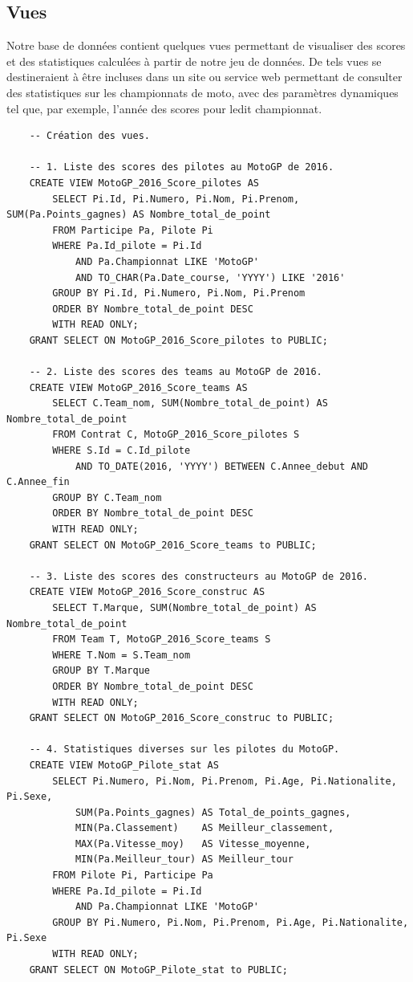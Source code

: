 \documentclass[12pt,a4paper]{article}
\newenvironment{code}{\captionsetup{type=listing}}{}
\begin{document}
\subsection{Vues}
\label{sub.views}

Notre base de données contient quelques vues permettant de visualiser des scores
et des statistiques calculées à partir de notre jeu de données. De tels vues se
destineraient à être incluses dans un site ou service web permettant de consulter
des statistiques sur les championnats de moto, avec des paramètres dynamiques
tel que, par exemple, l'année des scores pour ledit championnat.

\begin{code}
    \begin{verbatim}
    -- Création des vues.

    -- 1. Liste des scores des pilotes au MotoGP de 2016.
    CREATE VIEW MotoGP_2016_Score_pilotes AS
        SELECT Pi.Id, Pi.Numero, Pi.Nom, Pi.Prenom, SUM(Pa.Points_gagnes) AS Nombre_total_de_point
        FROM Participe Pa, Pilote Pi
        WHERE Pa.Id_pilote = Pi.Id
            AND Pa.Championnat LIKE 'MotoGP'
            AND TO_CHAR(Pa.Date_course, 'YYYY') LIKE '2016'
        GROUP BY Pi.Id, Pi.Numero, Pi.Nom, Pi.Prenom
        ORDER BY Nombre_total_de_point DESC
        WITH READ ONLY;
    GRANT SELECT ON MotoGP_2016_Score_pilotes to PUBLIC;

    -- 2. Liste des scores des teams au MotoGP de 2016.
    CREATE VIEW MotoGP_2016_Score_teams AS
        SELECT C.Team_nom, SUM(Nombre_total_de_point) AS Nombre_total_de_point
        FROM Contrat C, MotoGP_2016_Score_pilotes S
        WHERE S.Id = C.Id_pilote
            AND TO_DATE(2016, 'YYYY') BETWEEN C.Annee_debut AND C.Annee_fin
        GROUP BY C.Team_nom
        ORDER BY Nombre_total_de_point DESC
        WITH READ ONLY;
    GRANT SELECT ON MotoGP_2016_Score_teams to PUBLIC;

    -- 3. Liste des scores des constructeurs au MotoGP de 2016.
    CREATE VIEW MotoGP_2016_Score_construc AS
        SELECT T.Marque, SUM(Nombre_total_de_point) AS Nombre_total_de_point
        FROM Team T, MotoGP_2016_Score_teams S
        WHERE T.Nom = S.Team_nom
        GROUP BY T.Marque
        ORDER BY Nombre_total_de_point DESC
        WITH READ ONLY;
    GRANT SELECT ON MotoGP_2016_Score_construc to PUBLIC;

    -- 4. Statistiques diverses sur les pilotes du MotoGP.
    CREATE VIEW MotoGP_Pilote_stat AS
        SELECT Pi.Numero, Pi.Nom, Pi.Prenom, Pi.Age, Pi.Nationalite, Pi.Sexe,
            SUM(Pa.Points_gagnes) AS Total_de_points_gagnes,
            MIN(Pa.Classement)    AS Meilleur_classement,
            MAX(Pa.Vitesse_moy)   AS Vitesse_moyenne,
            MIN(Pa.Meilleur_tour) AS Meilleur_tour
        FROM Pilote Pi, Participe Pa
        WHERE Pa.Id_pilote = Pi.Id
            AND Pa.Championnat LIKE 'MotoGP'
        GROUP BY Pi.Numero, Pi.Nom, Pi.Prenom, Pi.Age, Pi.Nationalite, Pi.Sexe
        WITH READ ONLY;
    GRANT SELECT ON MotoGP_Pilote_stat to PUBLIC;


\end{verbatim}
\end{code}
\end{document}
